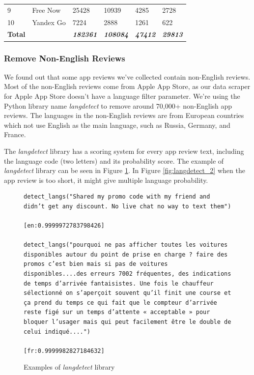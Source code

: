 \documentclass[12pt]{article}
\begin{document}
\begin{table}[!h]
\begin{tabular}{llllll}
9              & Free Now         & 25428                    & 10939                         & 4285                             & 2728                               \\
10             & Yandex Go        & 7224                     & 2888                          & 1261                             & 622                                \\
\hline
\textbf{Total} &                  & \textbf{\textit{182361}} & \textbf{\textit{108084}}      & \textbf{\textit{47412}}          & \textbf{\textit{29813}}           \\
\hline
\end{tabular}
\label{tab:preprocessing_result}
\end{table}
\subsubsection{Remove Non-English Reviews}
We found out that some app reviews we’ve collected contain non-English reviews. Most of the non-English reviews come from Apple App Store, as our data scraper for Apple App Store doesn’t have a language filter parameter. We’re using the Python library name \textit{langdetect}\cite{langdetect} to remove around 70,000+ non-English app reviews. The languages in the non-English reviews are from European countries which not use English as the main language, such as Russia, Germany, and France.

The \textit{langdetect} library has a scoring system for every app review text, including the language code (two letters) and its probability score. The example of \textit{langdetect} library can be seen in Figure \ref{fig:langdetect_1}. In Figure \ref{fig:langdetect_2} when the app review is too short, it might give multiple language probability.

\begin{figure}[!h]
\begin{lstlisting}
detect_langs("Shared my promo code with my friend and didn’t get any discount. No live chat no way to text them")

[en:0.9999972783798426]

detect_langs("pourquoi ne pas afficher toutes les voitures disponibles autour du point de prise en charge ? faire des promos c’est bien mais si pas de voitures disponibles....des erreurs 7002 fréquentes, des indications de temps d’arrivée fantaisistes. Une fois le chauffeur sélectionné on s’aperçoit souvent qu’il finit une course et ça prend du temps ce qui fait que le compteur d’arrivée reste figé sur un temps d’attente « acceptable » pour bloquer l’usager mais qui peut facilement être le double de celui indiqué....")

[fr:0.9999982827184632]
\end{lstlisting}
\caption{Examples of \textit{langdetect} library}
\label{fig:langdetect_1}
\end{figure}
\end{document}
